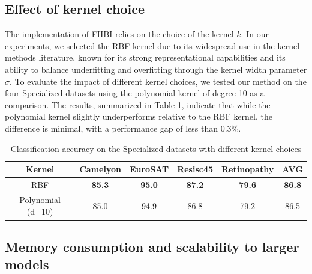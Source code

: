 \subsection{Effect of kernel choice}
\label{appendix: kernel choices}
The implementation of FHBI relies on the choice of the kernel $k$. In our experiments, we selected the RBF kernel due to its widespread use in the kernel methods literature, known for its strong representational capabilities and its ability to balance underfitting and overfitting through the kernel width parameter $\sigma$. To evaluate the impact of different kernel choices, we tested our method on the four Specialized datasets using the polynomial kernel of degree 10 as a comparison. The results, summarized in Table \ref{table: kernel choice}, indicate that while the polynomial kernel slightly underperforms relative to the RBF kernel, the difference is minimal, with a performance gap of less than 0.3\%.

\begin{table}[h]
\centering
\caption{Classification accuracy on the Specialized datasets with different kernel  choices}
\label{table: kernel choice}
\begin{tabular}{c|cccc|c}
{\color[HTML]{000000} Kernel}            & {\color[HTML]{000000} Camelyon}      & {\color[HTML]{000000} EuroSAT}       & {\color[HTML]{000000} Resisc45}      & {\color[HTML]{000000} Retinopathy}   & {\color[HTML]{000000} AVG}           \\ \hline
{\color[HTML]{000000} RBF}               & {\color[HTML]{000000} \textbf{85.3}} & {\color[HTML]{000000} \textbf{95.0}} & {\color[HTML]{000000} \textbf{87.2}} & {\color[HTML]{000000} \textbf{79.6}} & {\color[HTML]{000000} \textbf{86.8}} \\ \hline
{\color[HTML]{000000} Polynomial (d=10)} & {\color[HTML]{000000} 85.0}          & {\color[HTML]{000000} 94.9}          & {\color[HTML]{000000} 86.8}          & {\color[HTML]{000000} 79.2}          & {\color[HTML]{000000} 86.5}         
\end{tabular}
\end{table}

\subsection{Memory consumption and scalability to larger models}

